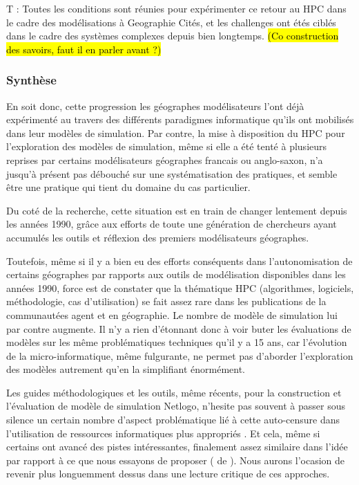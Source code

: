 T : Toutes les conditions sont réunies pour expérimenter ce retour au HPC dans le cadre des modélisations à Geographie Cités, et les challenges ont étés ciblés dans le cadre des systèmes complexes depuis bien longtemps. \hl{(Co construction des savoirs, faut il en parler avant ?)}

\subsubsection{Synthèse}
\label{sssec:synthese}


En soit donc, cette progression les géographes modélisateurs l'ont déjà expérimenté au travers des différents paradigmes informatique qu'ils ont mobilisés dans leur modèles de simulation. Par contre, la mise à disposition du HPC pour l'exploration des modèles de simulation, même si elle a été tenté à plusieurs reprises par certains modélisateurs géographes francais ou anglo-saxon, n'a jusqu'à présent pas débouché sur une systématisation des pratiques, et semble être une pratique qui tient du domaine du cas particulier.


Du coté de la recherche, cette situation est en train de changer lentement depuis les années 1990, grâce aux efforts de toute une génération de chercheurs ayant accumulés les outils et réflexion des premiers modélisateurs géographes.

Toutefois, même si il y a bien eu des efforts conséquents dans l'autonomisation de certains géographes par rapports aux outils de modélisation disponibles dans les années 1990, force est de constater que la thématique HPC (algorithmes, logiciels, méthodologie, cas d'utilisation) se fait assez rare dans les publications de la communautées agent et en géographie. Le nombre de modèle de simulation lui par contre augmente. Il n'y a rien d'étonnant donc à voir buter les évaluations de modèles sur les même problématiques techniques qu'il y a 15 ans, car l'évolution de la micro-informatique, même fulgurante, ne permet pas d'aborder l'exploration des modèles autrement qu'en la simplifiant énormément.

Les guides méthodologiques et les outils, même récents, pour la construction et l'évaluation de modèle de simulation Netlogo, n'hesite pas souvent à passer sous silence un certain nombre d'aspect problématique lié à cette auto-censure dans l'utilisation de ressources informatiques plus appropriés \autocites{Gilbert2008, Grimm2011a}. Et cela, même si certains ont avancé des pistes intéressantes, finalement assez similaire dans l'idée par rapport à ce que nous essayons de proposer (\textcite{Behavior Search} de \textcite{Stonedahl2011a}). Nous aurons l'ocasion de revenir plus longuemment dessus dans une lecture critique de ces approches.

